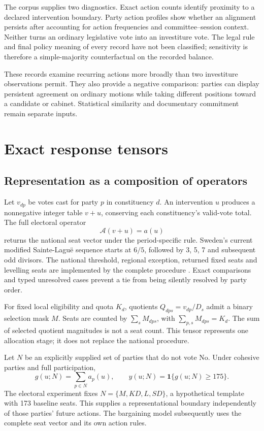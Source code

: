 \documentclass[11pt,a4paper]{article}
\newcommand{\ind}{\mathbf{1}}
\begin{document}
The corpus supplies two diagnostics. Exact action counts identify proximity to a declared intervention boundary. Party action profiles show whether an alignment persists after accounting for action frequencies and committee--session context. Neither turns an ordinary legislative vote into an investiture vote. The legal rule and final policy meaning of every record have not been classified; sensitivity is therefore a simple-majority counterfactual on the recorded balance.

These records examine recurring actions more broadly than two investiture observations permit. They also provide a negative comparison: parties can display persistent agreement on ordinary motions while taking different positions toward a candidate or cabinet. Statistical similarity and documentary commitment remain separate inputs.

\section{Exact response tensors}

\subsection{Representation as a composition of operators}

Let \(v_{dp}\) be votes cast for party \(p\) in constituency \(d\). An intervention \(u\) produces a nonnegative integer table \(v+u\), conserving each constituency's valid-vote total. The full electoral operator
\[
\mathcal A(v+u)=a(u)
\]
returns the national seat vector under the period-specific rule. Sweden's current modified Sainte-Lagu\"e sequence starts at \(6/5\), followed by 3, 5, 7 and subsequent odd divisors. The national threshold, regional exception, returned fixed seats and levelling seats are implemented by the complete procedure \citep{valmyndigheten,vallag}. Exact comparisons and typed unresolved cases prevent a tie from being silently resolved by party order.

For fixed local eligibility and quota \(K_d\), quotients \(Q_{dps}=v_{dp}/D_s\) admit a binary selection mask \(M\). Seats are counted by \(\sum_sM_{dps}\), with \(\sum_{p,s}M_{dps}=K_d\). The sum of selected quotient magnitudes is not a seat count. This tensor represents one allocation stage; it does not replace the national procedure.

Let \(N\) be an explicitly supplied set of parties that do not vote No. Under cohesive parties and full participation,
\[
g(u;N)=\sum_{p\in N}a_p(u),\qquad
y(u;N)=\ind\{g(u;N)\ge175\}.
\]
The electoral experiment fixes \(N=\{M,KD,L,SD\}\), a hypothetical template with 173 baseline seats. This supplies a representational boundary independently of those parties' future actions. The bargaining model subsequently uses the complete seat vector and its own action rules.
\end{document}

